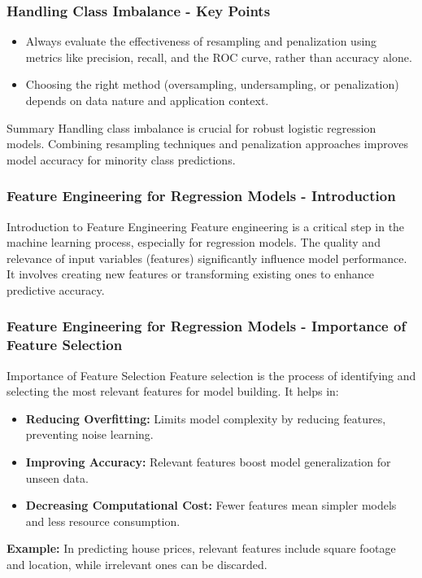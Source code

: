 \documentclass[aspectratio=169]{beamer}
\begin{document}
\begin{frame}[fragile]
    \frametitle{Handling Class Imbalance - Key Points}
    \begin{itemize}
        \item Always evaluate the effectiveness of resampling and penalization using metrics like precision, recall, and the ROC curve, rather than accuracy alone.
        \item Choosing the right method (oversampling, undersampling, or penalization) depends on data nature and application context.
    \end{itemize}
    \begin{block}{Summary}
        Handling class imbalance is crucial for robust logistic regression models. Combining resampling techniques and penalization approaches improves model accuracy for minority class predictions.
    \end{block}
\end{frame}

\begin{frame}[fragile]
    \frametitle{Feature Engineering for Regression Models - Introduction}
    \begin{block}{Introduction to Feature Engineering}
        Feature engineering is a critical step in the machine learning process, especially for regression models. The quality and relevance of input variables (features) significantly influence model performance. 
        It involves creating new features or transforming existing ones to enhance predictive accuracy.
    \end{block}
\end{frame}

\begin{frame}[fragile]
    \frametitle{Feature Engineering for Regression Models - Importance of Feature Selection}
    \begin{block}{Importance of Feature Selection}
        Feature selection is the process of identifying and selecting the most relevant features for model building. It helps in:
        \begin{itemize}
            \item \textbf{Reducing Overfitting:} Limits model complexity by reducing features, preventing noise learning.
            \item \textbf{Improving Accuracy:} Relevant features boost model generalization for unseen data.
            \item \textbf{Decreasing Computational Cost:} Fewer features mean simpler models and less resource consumption.
        \end{itemize}
        \textbf{Example:} In predicting house prices, relevant features include square footage and location, while irrelevant ones can be discarded.
    \end{block}
\end{frame}
\end{document}
